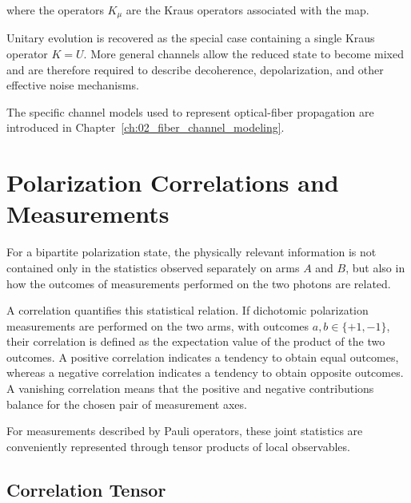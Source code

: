 where the operators \(K_\mu\) are the Kraus operators associated with the map.

Unitary evolution is recovered as the special case containing a single Kraus
operator \(K=U\). More general channels allow the reduced state to become mixed
and are therefore required to describe decoherence, depolarization, and other
effective noise mechanisms.

The specific channel models used to represent optical-fiber propagation are
introduced in Chapter~\ref{ch:02_fiber_channel_modeling}.


\section{Polarization Correlations and Measurements}
\label{sec:polarization_correlations_measurements}

For a bipartite polarization state, the physically relevant information is not
contained only in the statistics observed separately on arms \(A\) and \(B\), but
also in how the outcomes of measurements performed on the two photons are related.

A correlation quantifies this statistical relation. If dichotomic polarization
measurements are performed on the two arms, with outcomes
\(a,b\in\{+1,-1\}\), their correlation is defined as the expectation value of the
product of the two outcomes. A positive correlation indicates a tendency to obtain
equal outcomes, whereas a negative correlation indicates a tendency to obtain
opposite outcomes. A vanishing correlation means that the positive and negative
contributions balance for the chosen pair of measurement axes.

For measurements described by Pauli operators, these joint statistics are
conveniently represented through tensor products of local observables.



\subsection{Correlation Tensor}
\label{subsec:correlation_tensor}

